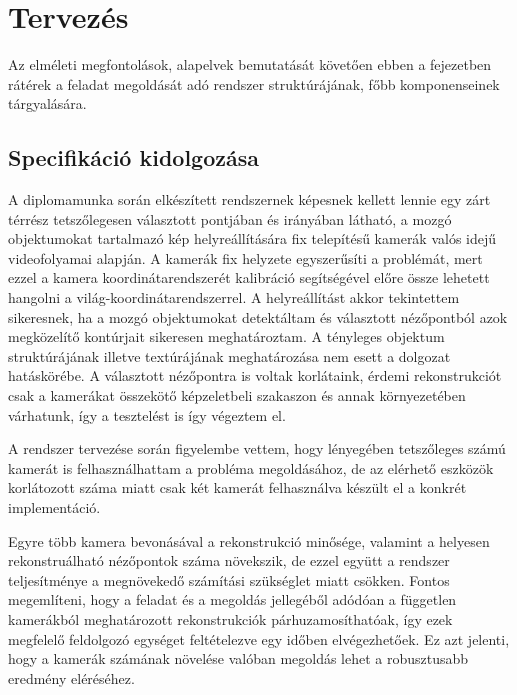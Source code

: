 \chapter{Tervezés \label{chapter3}}

Az elméleti megfontolások, alapelvek bemutatását követően ebben a fejezetben rátérek a feladat megoldását adó rendszer struktúrájának, főbb komponenseinek tárgyalására.

\section{Specifikáció kidolgozása}

A diplomamunka során elkészített rendszernek képesnek kellett lennie egy zárt térrész tetszőlegesen választott pontjában és irányában látható, a mozgó objektumokat tartalmazó kép helyreállítására fix telepítésű kamerák valós idejű videofolyamai alapján. A kamerák fix helyzete egyszerűsíti a problémát, mert ezzel a kamera koordinátarendszerét kalibráció segítségével előre össze lehetett hangolni a világ-koordinátarendszerrel. A helyreállítást akkor tekintettem sikeresnek, ha a mozgó objektumokat detektáltam és választott nézőpontból azok megközelítő kontúrjait sikeresen meghatároztam. A tényleges objektum struktúrájának illetve textúrájának meghatározása nem esett a dolgozat hatáskörébe. A választott nézőpontra is voltak korlátaink, érdemi rekonstrukciót csak a kamerákat összekötő képzeletbeli szakaszon és annak környezetében várhatunk, így a tesztelést is így végeztem el.

A rendszer tervezése során figyelembe vettem, hogy lényegében tetszőleges számú kamerát is felhasználhattam a probléma megoldásához, de az elérhető eszközök korlátozott száma miatt csak két kamerát felhasználva készült el a konkrét implementáció.

Egyre több kamera bevonásával a rekonstrukció minősége, valamint a helyesen rekonstruálható nézőpontok száma növekszik, de ezzel együtt a rendszer teljesítménye a megnövekedő számítási szükséglet miatt csökken. Fontos megemlíteni, hogy a feladat és a megoldás jellegéből adódóan a független kamerákból meghatározott rekonstrukciók párhuzamosíthatóak, így ezek megfelelő feldolgozó egységet feltételezve egy időben elvégezhetőek. Ez azt jelenti, hogy a kamerák számának növelése valóban megoldás lehet a robusztusabb eredmény eléréséhez.

